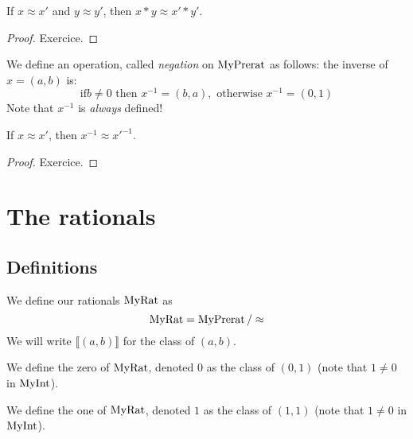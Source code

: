 \begin{lemma}
    \label{MyPrerat.mul_quotient}
    \leanok
If $x \approx x'$ and $y \approx y'$, then $x * y \approx x' * y'$.
\end{lemma}
\begin{proof}
\leanok
Exercice.
\end{proof}

\begin{definition}
    \label{MyPrerat.inv}
    \leanok
We define an operation, called \emph{negation} on $\mathrm{MyPrerat}$ as follows: the inverse of $x = (a,b)$ is:
\[
\mbox{if} b \neq 0 \mbox{ then } x^{-1} = (b, a), \mbox{ otherwise } x^{-1} = (0, 1)
\]
Note that $x^{-1}$ is \emph{always} defined!
\end{definition}

\begin{lemma}
    \label{MyPrerat.inv_quotient}
    \leanok
If $x \approx x'$, then $x^{-1} \approx x'^{-1}$.
\end{lemma}
\begin{proof}
\leanok
Exercice.
\end{proof}

\section{The rationals}

\subsection{Definitions}

\begin{definition}
    \label{MyRat}
    \leanok
    We define our rationals $\mathrm{MyRat}$ as
\[
\mathrm{MyRat} = \mathrm{MyPrerat} \, / \approx
\]
We will write $\llbracket (a, b) \rrbracket$ for the class of $(a,b)$.
\end{definition}

\begin{definition}
    \label{MyRat.zero}
    \leanok
We define the zero of $\mathrm{MyRat}$, denoted $0$ as the class of $(0,1)$ (note that $1 \neq 0$ in $\mathrm{MyInt}$).
\end{definition}

\begin{definition}
    \label{MyRat.one}
    \leanok
We define the one of $\mathrm{MyRat}$, denoted $1$ as the class of $(1,1)$ (note that $1 \neq 0$ in $\mathrm{MyInt}$).
\end{definition}

